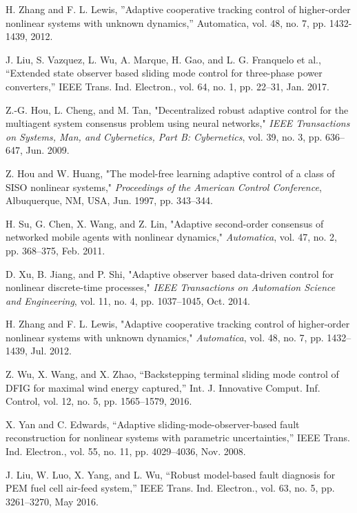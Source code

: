 \documentclass[journal,onecolumn]{IEEEtran}
\begin{document}
\begin{thebibliography}{99}
    H. Zhang and F. L. Lewis, ”Adaptive cooperative tracking control of higher-order nonlinear systems with unknown dynamics,” Automatica, vol. 48, no.
    7, pp. 1432-1439, 2012.

    J. Liu, S. Vazquez, L. Wu, A. Marque, H. Gao, and L. G. Franquelo
    et al., “Extended state observer based sliding mode control for three-phase
    power converters,” IEEE Trans. Ind. Electron., vol. 64, no. 1, pp. 22–31,
    Jan. 2017.
    
    Z.-G. Hou, L. Cheng, and M. Tan, "Decentralized robust adaptive control for the multiagent system consensus problem using neural networks," \emph{IEEE Transactions on Systems, Man, and Cybernetics, Part B: Cybernetics}, vol. 39, no. 3, pp. 636–647, Jun. 2009.
    
    Z. Hou and W. Huang, "The model-free learning adaptive control of a class of SISO nonlinear systems," \emph{Proceedings of the American Control Conference}, Albuquerque, NM, USA, Jun. 1997, pp. 343–344.
    
    H. Su, G. Chen, X. Wang, and Z. Lin, "Adaptive second-order consensus of networked mobile agents with nonlinear dynamics," \emph{Automatica}, vol. 47, no. 2, pp. 368–375, Feb. 2011.
    
    D. Xu, B. Jiang, and P. Shi, "Adaptive observer based data-driven control for nonlinear discrete-time processes," \emph{IEEE Transactions on Automation Science and Engineering}, vol. 11, no. 4, pp. 1037–1045, Oct. 2014.
    
    H. Zhang and F. L. Lewis, "Adaptive cooperative tracking control of higher-order nonlinear systems with unknown dynamics," \emph{Automatica}, vol. 48, no. 7, pp. 1432–1439, Jul. 2012.
    
    Z. Wu, X. Wang, and X. Zhao, “Backstepping terminal sliding mode
    control of DFIG for maximal wind energy captured,” Int. J. Innovative
    Comput. Inf. Control, vol. 12, no. 5, pp. 1565–1579, 2016.

    X. Yan and C. Edwards, “Adaptive sliding-mode-observer-based fault
    reconstruction for nonlinear systems with parametric uncertainties,” IEEE
    Trans. Ind. Electron., vol. 55, no. 11, pp. 4029–4036, Nov. 2008.

    J. Liu, W. Luo, X. Yang, and L. Wu, “Robust model-based fault diagnosis
    for PEM fuel cell air-feed system,” IEEE Trans. Ind. Electron., vol. 63,
    no. 5, pp. 3261–3270, May 2016.


\end{thebibliography}
\end{document}
